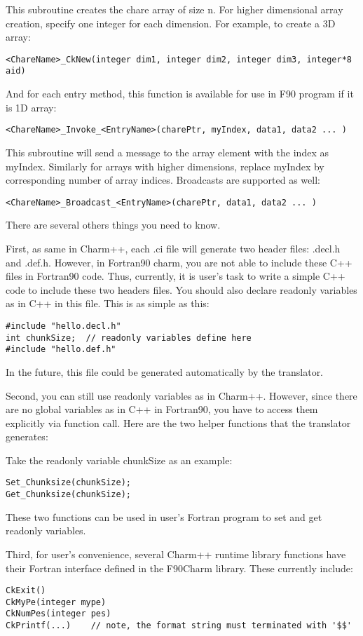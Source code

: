 \documentclass[11pt]{article}
\begin{document}
  This subroutine creates the chare array of size n. For higher dimensional
array creation, specify one integer for each dimension. For example, to create
a 3D array:

  \verb+<ChareName>_CkNew(integer dim1, integer dim2, integer dim3, integer*8 aid)+

And for each entry method, this function is available for use in F90 program
if it is 1D array:

  \verb+<ChareName>_Invoke_<EntryName>(charePtr, myIndex, data1, data2 ... )+

  This subroutine will send a message to the array element with the index
as myIndex. Similarly for arrays with higher dimensions, replace myIndex by
corresponding number of array indices. Broadcasts are supported as well:

  \verb+<ChareName>_Broadcast_<EntryName>(charePtr, data1, data2 ... )+

There are several others things you need to know.

First, as same in Charm++, each .ci file will generate two header files:
.decl.h and .def.h. However, in Fortran90 charm, you are not able to include 
these C++ files in Fortran90 code. Thus, currently, it is user's 
task to write a simple C++ code to include these two headers files. 
You should also declare readonly variables as in C++ in this file. This is as 
simple as this:

\begin{verbatim}
#include "hello.decl.h"
int chunkSize; 	// readonly variables define here
#include "hello.def.h"
\end{verbatim}

In the future, this file could be generated automatically by the translator.

Second, you can still use readonly variables as in Charm++. However, since
there are no global variables as in C++ in Fortran90, you have to access them
explicitly via function call. Here are the two helper functions that the 
translator generates:

Take the readonly variable chunkSize as an example:
\begin{verbatim}
Set_Chunksize(chunkSize);
Get_Chunksize(chunkSize);
\end{verbatim}
These two functions can be used in user's Fortran program to set and get 
readonly variables.

Third, for user's convenience, several Charm++ runtime library functions
have their Fortran interface defined in the F90Charm library. These currently
include:
\begin{verbatim}
CkExit()
CkMyPe(integer mype)
CkNumPes(integer pes)
CkPrintf(...)    // note, the format string must terminated with '$$'
\end{verbatim}
\end{document}
